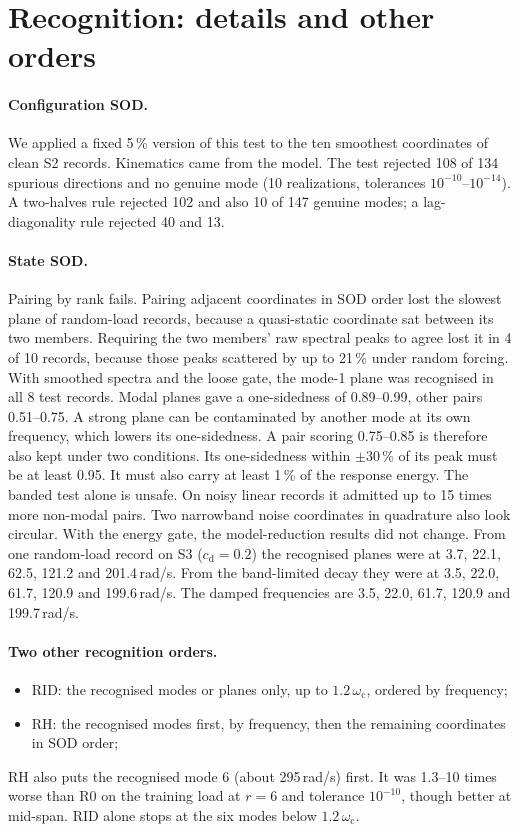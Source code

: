 \documentclass[11pt]{article}
\begin{document}
\section{Recognition: details and other orders}\label{sec:s-recog}
\paragraph{Configuration SOD.}
We applied a fixed 5\,\% version of this test to the ten smoothest coordinates of clean S2 records. Kinematics came from the model. The test rejected 108 of 134 spurious directions and no genuine mode (10 realizations, tolerances $10^{-10}$--$10^{-14}$). A two-halves rule rejected 102 and also 10 of 147 genuine modes; a lag-diagonality rule rejected 40 and 13.
\paragraph{State SOD.}
Pairing by rank fails. Pairing adjacent coordinates in SOD order lost the slowest plane of random-load records, because a quasi-static coordinate sat between its two members. Requiring the two members' raw spectral peaks to agree lost it in 4 of 10 records, because those peaks scattered by up to 21\,\% under random forcing. With smoothed spectra and the loose gate, the mode-1 plane was recognised in all 8 test records. Modal planes gave a one-sidedness of 0.89--0.99, other pairs 0.51--0.75. A strong plane can be contaminated by another mode at its own frequency, which lowers its one-sidedness. A pair scoring 0.75--0.85 is therefore also kept under two conditions. Its one-sidedness within $\pm30\,\%$ of its peak must be at least 0.95. It must also carry at least 1\,\% of the response energy. The banded test alone is unsafe. On noisy linear records it admitted up to 15 times more non-modal pairs. Two narrowband noise coordinates in quadrature also look circular. With the energy gate, the model-reduction results did not change. From one random-load record on S3 ($c_{\mathrm d}=0.2$) the recognised planes were at 3.7, 22.1, 62.5, 121.2 and 201.4\,rad/s. From the band-limited decay they were at 3.5, 22.0, 61.7, 120.9 and 199.6\,rad/s. The damped frequencies are 3.5, 22.0, 61.7, 120.9 and 199.7\,rad/s.
\paragraph{Two other recognition orders.}
\begin{itemize}
\item RID: the recognised modes or planes only, up to $1.2\,\omega_{\mathrm c}$, ordered by frequency;
\item RH: the recognised modes first, by frequency, then the remaining coordinates in SOD order;
\end{itemize}
RH also puts the recognised mode 6 (about 295\,rad/s) first. It was 1.3--10 times worse than R0 on the training load at $r=6$ and tolerance $10^{-10}$, though better at mid-span. RID alone stops at the six modes below $1.2\,\omega_{\mathrm c}$.
\end{document}
